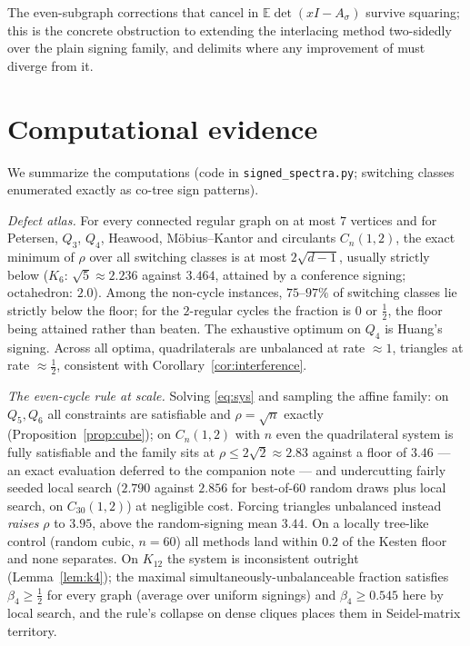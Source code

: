 \documentclass[11pt]{article}
\theoremstyle{remark}
\newcommand{\rhomax}{\rho}
\begin{document}
The even-subgraph corrections that cancel in
$\mathbb{E}\det(xI-A_\sigma)$ survive squaring; this is the concrete
obstruction to extending the interlacing method two-sidedly over the
plain signing family, and delimits where any improvement of
\cite{xuzhang26} must diverge from it.

\section{Computational evidence}\label{sec:experiments}

We summarize the computations (code in \texttt{signed\_spectra.py};
switching classes enumerated exactly as co-tree sign patterns).

\emph{Defect atlas.} For every connected regular graph on at most $7$
vertices and for Petersen, $Q_3$, $Q_4$, Heawood, M\"obius--Kantor and
circulants $C_n(1,2)$, the exact minimum of $\rhomax$ over all switching
classes is at most $2\sqrt{d-1}$, usually strictly below
($K_6$: $\sqrt5\approx2.236$ against $3.464$, attained by a conference
signing; octahedron: $2.0$). Among the non-cycle instances, $75$--$97\%$ of switching classes lie
strictly below the floor; for the $2$-regular cycles the fraction is
$0$ or $\tfrac12$, the floor being attained rather than beaten. The exhaustive optimum on $Q_4$ is
Huang's signing. Across all optima, quadrilaterals are unbalanced at
rate $\approx1$, triangles at rate $\approx\tfrac12$, consistent with
Corollary~\ref{cor:interference}.

\emph{The even-cycle rule at scale.} Solving \eqref{eq:sys} and sampling
the affine family: on $Q_5,Q_6$ all constraints are satisfiable and
$\rhomax=\sqrt n$ exactly (Proposition~\ref{prop:cube}); on $C_n(1,2)$ with $n$ even the
quadrilateral system is fully satisfiable and the family sits at
$\rhomax\le2\sqrt2\approx2.83$ against a floor of $3.46$ --- an exact evaluation deferred to the companion note
\cite{companion} --- and undercutting fairly seeded local search
($2.790$ against $2.856$ for best-of-$60$ random draws plus local
search, on $C_{30}(1,2)$) at negligible cost. Forcing triangles
unbalanced instead \emph{raises} $\rhomax$ to $3.95$, above the
random-signing mean $3.44$. On a locally tree-like control (random
cubic, $n=60$) all methods land within $0.2$ of the Kesten floor and
none separates. On $K_{12}$ the system is inconsistent outright (Lemma~\ref{lem:k4});
the maximal simultaneously-unbalanceable fraction satisfies
$\beta_4\ge\tfrac12$ for every graph (average over uniform signings)
and $\beta_4\ge0.545$ here by local search, and the rule's collapse on
dense cliques places them in Seidel-matrix territory.
\end{document}
